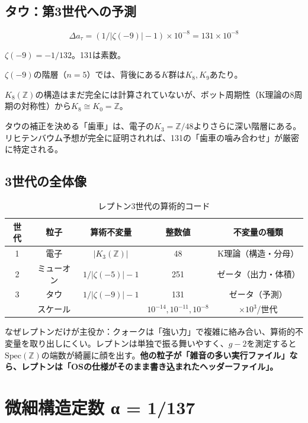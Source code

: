 \documentclass[12pt,a4paper]{article}
\newcommand{\Spec}{\mathrm{Spec}}
\begin{document}
\subsection{タウ：第3世代への予測}

$$\Delta a_\tau = (1/|\zeta(-9)| - 1) \times 10^{-8} = 131 \times 10^{-8}$$

$\zeta(-9) = -1/132$。131は素数。

\begin{mathbox}[タウと$K$群の「歯車」]
$\zeta(-9)$の階層（$n=5$）では、背後にある$K$群は$K_8, K_9$あたり。

$K_8(\mathbb{Z})$の構造はまだ完全には計算されていないが、ボット周期性（K理論の8周期の対称性）から$K_8 \cong K_0 = \mathbb{Z}$。

タウの補正を決める「歯車」は、電子の$K_3 = \mathbb{Z}/48$よりさらに深い階層にある。リヒテンバウム予想が完全に証明されれば、131の「歯車の噛み合わせ」が厳密に特定される。
\end{mathbox}

\subsection{3世代の全体像}

\begin{table}[h]
\centering
\caption{レプトン3世代の算術的コード}
\begin{tabular}{@{}ccccc@{}}
\toprule
世代 & 粒子 & 算術不変量 & 整数値 & 不変量の種類 \\
\midrule
1 & 電子 & $|K_3(\mathbb{Z})|$ & 48 & K理論（構造・分母） \\
2 & ミューオン & $1/|\zeta(-5)| - 1$ & 251 & ゼータ（出力・体積） \\
3 & タウ & $1/|\zeta(-9)| - 1$ & 131 & ゼータ（予測） \\
\midrule
& スケール & & $10^{-14}, 10^{-11}, 10^{-8}$ & $\times 10^3$/世代 \\
\bottomrule
\end{tabular}
\end{table}

なぜレプトンだけが主役か：クォークは「強い力」で複雑に絡み合い、算術的不変量を取り出しにくい。レプトンは単独で振る舞いやすく、$g-2$を測定すると$\Spec(\mathbb{Z})$の端数が綺麗に顔を出す。\textbf{他の粒子が「雑音の多い実行ファイル」なら、レプトンは「OSの仕様がそのまま書き込まれたヘッダーファイル」。}

\section{微細構造定数 α = 1/137}
\end{document}
